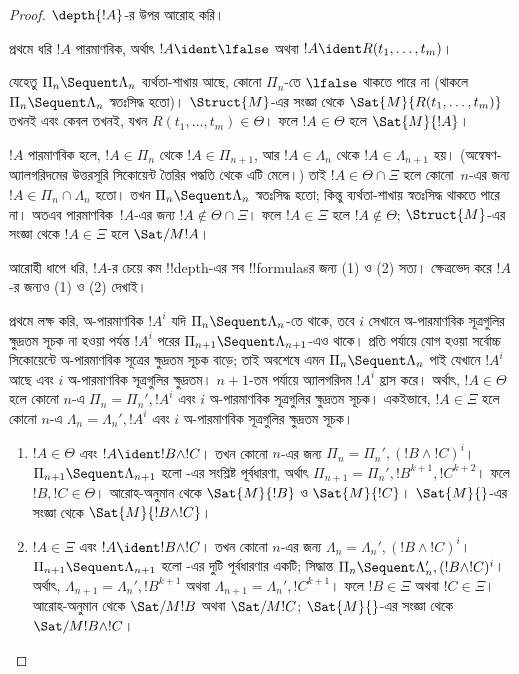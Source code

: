 \documentclass[../../../include/open-logic-section]{subfiles}
\begin{document}
\begin{proof}
  $\depth{!A}$-র উপর আরোহ করি।

প্রথমে ধরি $!A$ পারমাণবিক,
অর্থাৎ $!A \ident \lfalse$ অথবা
$!A \ident R(t_1, \dots, t_m)$।

যেহেতু $\Pi_n \Sequent \Lambda_n$
ব্যর্থতা-শাখায় আছে,
কোনো $\Pi_n$-তে
$\lfalse$ থাকতে পারে না
(থাকলে $\Pi_n \Sequent \Lambda_n$
স্বতঃসিদ্ধ হতো)।
$\Struct{M}$-এর সংজ্ঞা থেকে
$\Sat{M}{R(t_1, \dots, t_m)}$
তখনই এবং কেবল তখনই,
যখন $R(t_1, \dots, t_m) \in
\Theta$। ফলে $!A \in
\Theta$ হলে $\Sat{M}{!A}$।

$!A$ পারমাণবিক হলে,
$!A \in \Pi_n$ থেকে
$!A \in \Pi_{n+1}$,
আর $!A \in \Lambda_n$ থেকে
$!A \in \Lambda_{n+1}$ হয়।
(অন্বেষণ-অ্যালগরিদমের
উত্তরসূরি সিকোয়েন্ট তৈরির
পদ্ধতি থেকে এটি মেলে।)
তাই $!A \in \Theta \cap \Xi$
হলে কোনো~$n$-এর জন্য
$!A \in \Pi_n \cap
\Lambda_n$ হতো। তখন
$\Pi_n \Sequent \Lambda_n$
স্বতঃসিদ্ধ হতো; কিন্তু
ব্যর্থতা-শাখায় স্বতঃসিদ্ধ
থাকতে পারে না।
অতএব পারমাণবিক~$!A$-এর
জন্য $!A \notin \Theta
\cap \Xi$। ফলে
$!A \in \Xi$ হলে
$!A \notin \Theta$;
$\Struct{M}$-এর সংজ্ঞা থেকে
$!A \in \Xi$ হলে
$\Sat/{M}{!A}$।

আরোহী ধাপে ধরি,
$!A$-র চেয়ে কম
!!{depth}-এর সব
!!{formula}sর জন্য
(1) ও (2) সত্য।
ক্ষেত্রভেদ করে $!A$-র
জন্যও (1) ও (2) দেখাই।

প্রথমে লক্ষ করি, অ-পারমাণবিক
$!A^i$ যদি $\Pi_n \Sequent \Lambda_n$-তে
থাকে, তবে $i$ সেখানে অ-পারমাণবিক
সূত্রগুলির ক্ষুদ্রতম সূচক না হওয়া
পর্যন্ত $!A^i$ পরের
$\Pi_{n+1} \Sequent \Lambda_{n+1}$-এও
থাকে। প্রতি পর্যায়ে যোগ হওয়া
সর্বোচ্চ সিকোয়েন্টে অ-পারমাণবিক সূত্রের ক্ষুদ্রতম
সূচক বাড়ে; তাই অবশেষে
এমন $\Pi_n \Sequent \Lambda_n$
পাই যেখানে $!A^i$ আছে
এবং $i$ অ-পারমাণবিক সূত্রগুলির ক্ষুদ্রতম।
$n+1$-তম পর্যায়ে অ্যালগরিদম
$!A^i$ হ্রাস করে।
অর্থাৎ, $!A \in \Theta$
হলে কোনো $n$-এ
$\Pi_n = \Pi_n', !A^i$
এবং $i$ অ-পারমাণবিক সূত্রগুলির ক্ষুদ্রতম সূচক।
একইভাবে, $!A \in \Xi$
হলে কোনো $n$-এ
$\Lambda_n = \Lambda_n', !A^i$
এবং $i$ অ-পারমাণবিক সূত্রগুলির ক্ষুদ্রতম সূচক।

\begin{enumerate}
  \item $!A \in \Theta$
  এবং $!A \ident !B \land !C$।
  তখন কোনো $n$-এর জন্য
  $\Pi_n = \Pi_n', (!B \land !C)^i$।
  $\Pi_{n+1} \Sequent
  \Lambda_{n+1}$ হলো
  \LeftR{\land}-এর সংশ্লিষ্ট
  পূর্বধারণা, অর্থাৎ
  $\Pi_{n+1} = \Pi_n', !B^{k+1}, !C^{k+2}$।
  ফলে $!B, !C \in
  \Theta$। আরোহ-অনুমান থেকে
  $\Sat{M}{!B}$ ও $\Sat{M}{!C}$।
  $\Sat{M}{}$-এর সংজ্ঞা থেকে
  $\Sat{M}{!B \land !C}$।

  \item $!A \in \Xi$
  এবং $!A \ident !B \land !C$।
  তখন কোনো $n$-এর জন্য
  $\Lambda_n = \Lambda_n', (!B \land !C)^i$।
  $\Pi_{n+1} \Sequent
  \Lambda_{n+1}$ হলো
  \RightR{\land}-এর
  দুটি পূর্বধারণার একটি;
  সিদ্ধান্ত
  $\Pi_n \Sequent \Lambda'_n, (!B \land !C)^i$।
  অর্থাৎ, $\Lambda_{n+1} =
  \Lambda_n', !B^{k+1}$
  অথবা $\Lambda_{n+1} =
  \Lambda_n', !C^{k+1}$।
  ফলে $!B \in \Xi$
  অথবা $!C \in \Xi$।
  আরোহ-অনুমান থেকে
  $\Sat/{M}{!B}$ অথবা
  $\Sat/{M}{!C}$;
  $\Sat{M}{}$-এর সংজ্ঞা থেকে
  $\Sat/{M}{!B \land !C}$।


\end{enumerate}
\end{proof}
\end{document}
